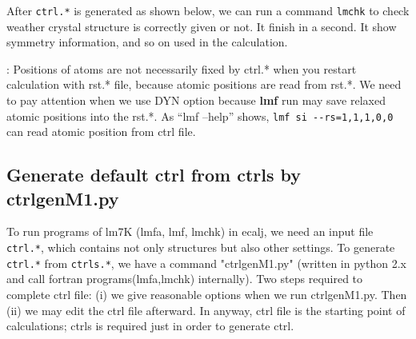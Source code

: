 \documentclass[a4paper,10pt,epsf,fleqn]{article}
\newcommand{\exe}[1]{{\bf #1}\index{#1}}
\newcommand{\io}[1]{{\sf  #1}\index{#1}}
\begin{document}
After \verb+ctrl.*+ is generated as shown below, 
we can run a command \verb+lmchk+ to check weather crystal
structure is correctly given or not. It finish in a second.
It show symmetry information, and so on used in the calculation.

: 
Positions of atoms are not necessarily fixed by \io{ctrl.*} when
you restart calculation with \io{rst.*} file, because 
atomic positions are read from \io{rst.*}.
We need to pay attention when we use DYN option because
\exe{lmf} run may save relaxed atomic positions into the \io{rst.*}.
As ``lmf --help'' shows, \verb#lmf si --rs=1,1,1,0,0# can read atomic
position from ctrl file.


\subsection{Generate default ctrl from ctrls by ctrlgenM1.py}
To run programs of lm7K (lmfa, lmf, lmchk) in ecalj,
we need an input file \verb+ctrl.*+, which contains not only structures
but also other settings.
To generate \verb+ctrl.*+ from \verb+ctrls.*+, we have a command "ctrlgenM1.py" (written
in python 2.x and call fortran programs(lmfa,lmchk) internally).
Two steps required to complete ctrl file:
(i) we give reasonable options when we run ctrlgenM1.py. 
Then (ii) we may edit the ctrl file afterward.
In anyway, ctrl file is the starting point of calculations;
ctrls is required just in order to generate ctrl.
\end{document}
